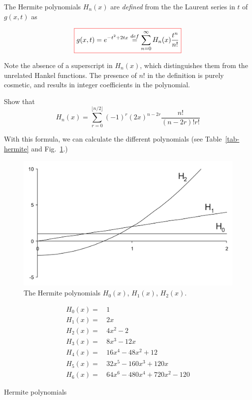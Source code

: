 The Hermite polynomials $H_n(x)$ are \emph{defined} from the the Laurent series in $t$ of $g(x,t)$ as 

\begin{equation}
\fbox{$\displaystyle
  g(x,t) = e^{-t^2 + 2tx} \stackrel{def}{=} \sum_{n = 0}^{\infty} H_n(x)\frac{t^n}{n!} \label{eq-g-hermite}
$}
\end{equation} 

\noindent{}Note the absence of a superscript in $H_n(x)$, which distinguishes them from the unrelated Hankel functions. The presence of $n!$ in the definition is purely cosmetic, and results in integer coefficients in the polynomial.

\begin{exer}
\noindent{}Show that
$$H_n(x) = \sum_{r=0}^{\lfloor n/2 \rfloor}(-1)^r {(2x)}^{n-2r} \frac{n!}{(n-2r)! r!}$$
\end{exer}

With this formula, we can calculate the different polynomials (see Table~\ref{tab-hermite} and Fig.~\ref{fig-hermite}.)

\begin{figure}
\centering
\includegraphics[scale=0.7]{hermite/figures/hermite}
\caption{The Hermite polynomials $H_0(x)$, $H_1(x)$, $H_2(x)$.}
\label{fig-hermite}
\end{figure}

\begin{table}
\begin{align}
H_0(x) = & \, 1 \nonumber \\
H_1(x) = & \, 2x \nonumber \\
H_2(x) = & \, 4x^2-2 \nonumber \\
H_3(x) = & \, 8x^3-12x \nonumber \\
H_4(x) = & \, 16x^4-48x^2+12 \nonumber \\
H_5(x) = & \, 32x^5-160x^3+120x \nonumber \\
H_6(x) = & \, 64x^6-480x^4+720x^2-120 \nonumber
\end{align}
\caption{Hermite polynomials}
\label{tab-hermite}
\end{table}

